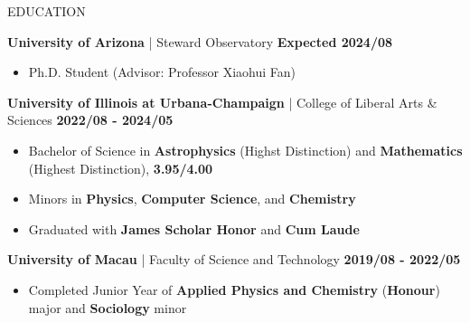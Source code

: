 \documentclass[11pt]{article} %
\begin{document}

\begin{section}{EDUCATION}

\textbf{University of Arizona} | Steward Observatory \hfill \textbf{Expected 2024/08}
\begin{itemize}[leftmargin=1.5em]
    \item Ph.D. Student (Advisor: Professor Xiaohui Fan)
\end{itemize}
\textbf{University of Illinois at Urbana-Champaign} | College of Liberal Arts \& Sciences \hfill \textbf{2022/08 - 2024/05}
\begin{itemize}[leftmargin=1.5em]
    \item Bachelor of Science in \textbf{Astrophysics} (Highst Distinction) and \textbf{Mathematics} (Highest Distinction), \textbf{3.95/4.00}
    \item Minors in \textbf{Physics}, \textbf{Computer Science}, and \textbf{Chemistry}
    \item Graduated with \textbf{James Scholar Honor} and \textbf{Cum Laude}
\end{itemize}
\textbf{University of Macau} | Faculty of Science and Technology \hfill \textbf{2019/08 - 2022/05}
\begin{itemize}[leftmargin=1.5em]
    \item Completed Junior Year of \textbf{Applied Physics and Chemistry} (\textbf{Honour}) major and \textbf{Sociology} minor %
\end{itemize}

\end{section}
\end{document}

